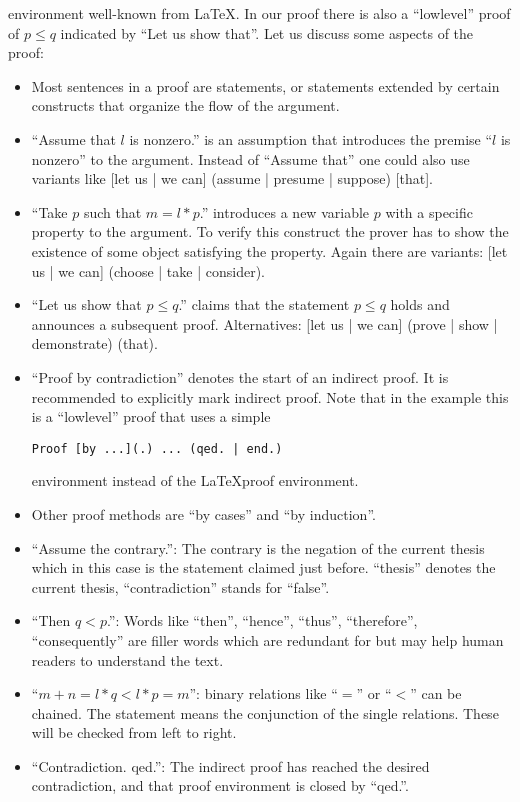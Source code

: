 \documentclass[11pt]{article}
\begin{document}
\noindent environment well-known from \LaTeX.
In our proof there is also a ``lowlevel'' proof of $p \leq q$
indicated by ``Let us show that''. Let us discuss some aspects of the
proof:
\begin{itemize}
\item Most sentences in a proof are statements, or statements
extended by certain constructs that organize the flow of the argument.
\item ``Assume that $l$ is nonzero.'' is an assumption that introduces
the premise ``$l$ is nonzero'' to the argument. Instead of ``Assume that''
one could also use variants like 
[let us | we can] (assume | presume | suppose) [that].
\item ``Take $p$ such that $m = l * p$.'' introduces a new variable
$p$ with a specific property to the argument. To verify this construct 
the prover has to show the existence of some object satisfying the
property. Again there are variants:
[let us | we can] (choose | take | consider).
\item ``Let us show that $p \leq q$.'' claims that the statement
$p \leq q$ holds and announces a subsequent proof.
Alternatives: [let us | we can] (prove | show | demonstrate) (that).
\item ``Proof by contradiction'' denotes the start of an indirect
proof. It is recommended to explicitly mark indirect proof.
Note that in the example this is a ``lowlevel'' proof that
uses a simple 

\verb+Proof [by ...](.) ... (qed. | end.)+

\noindent environment instead of the \LaTeX proof environment.
\item Other proof methods are ``by cases'' and ``by induction''.
\item ``Assume the contrary.'': The contrary is the negation
of the current thesis which in this case is the statement claimed
just before. ``thesis'' denotes the current thesis, ``contradiction''
stands for ``false''.
\item ``Then $q < p$.'': Words like ``then'', ``hence'', ``thus'',
``therefore'', ``consequently'' are filler words which are redundant
for \Naproche{} but may help human readers to understand the text.
\item ``$m+n = l * q < l * p = m$'': binary relations like ``$=$''
or ``$<$'' can be chained. The statement means the conjunction
of the single relations. These will be checked from
left to right.
\item ``Contradiction. qed.'': The indirect proof has reached the
desired contradiction, and that proof environment is closed by
``qed.''.
\end{itemize}
\end{document}
